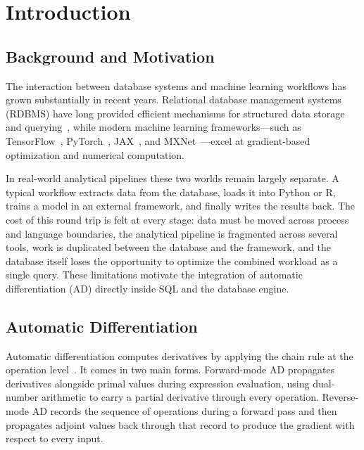 \documentclass[12pt]{report}
\begin{document}
\newpage




\chapter{Introduction}
\label{ch:introduction}

\section{Background and Motivation}

The interaction between database systems and machine learning workflows has
grown substantially in recent years. Relational database management systems
(RDBMS) have long provided efficient mechanisms for structured data storage and
querying~\cite{codd1970relational,selinger1979access}, while modern machine
learning frameworks---such as TensorFlow~\cite{abadi2016tensorflow},
PyTorch~\cite{paszke2019pytorch}, JAX~\cite{jax2018}, and
MXNet~\cite{chen2015mxnet}---excel at gradient-based optimization and numerical
computation.

In real-world analytical pipelines these two worlds remain largely separate. A
typical workflow extracts data from the database, loads it into Python or R,
trains a model in an external framework, and finally writes the results back.
The cost of this round trip is felt at every stage: data must be moved across
process and language boundaries, the analytical pipeline is fragmented across
several tools, work is duplicated between the database and the framework, and
the database itself loses the opportunity to optimize the combined workload as a
single query. These limitations motivate the integration of automatic
differentiation (AD) directly inside SQL and the database engine.

\section{Automatic Differentiation}

Automatic differentiation computes derivatives by applying the chain rule at the
operation level~\cite{baydin2017automatic,griewank2008evaluating}. It comes in
two main forms. Forward-mode AD propagates derivatives alongside primal values
during expression evaluation, using dual-number arithmetic to carry a partial
derivative through every operation. Reverse-mode AD records the sequence of
operations during a forward pass and then propagates adjoint values back through
that record to produce the gradient with respect to every input.
\end{document}
